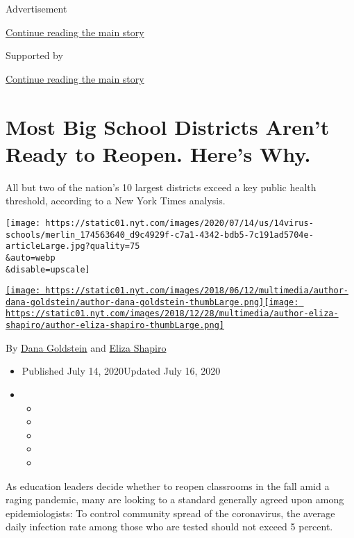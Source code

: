 Advertisement

\protect\hyperlink{after-top}{Continue reading the main story}

Supported by

\protect\hyperlink{after-sponsor}{Continue reading the main story}

\hypertarget{most-big-school-districts-arent-ready-to-reopen-heres-why}{%
\section{Most Big School Districts Aren't Ready to Reopen. Here's
Why.}\label{most-big-school-districts-arent-ready-to-reopen-heres-why}}

All but two of the nation's 10 largest districts exceed a key public
health threshold, according to a New York Times analysis.

\texttt{[image: https://static01.nyt.com/images/2020/07/14/us/14virus-schools/merlin\_174563640\_d9c4929f-c7a1-4342-bdb5-7c191ad5704e-articleLarge.jpg?quality=75\\\&auto=webp\\\&disable=upscale]}

\href{https://www.nytimes.com/by/dana-goldstein}{\texttt{[image: https://static01.nyt.com/images/2018/06/12/multimedia/author-dana-goldstein/author-dana-goldstein-thumbLarge.png]}}\href{https://www.nytimes.com/by/eliza-shapiro}{\texttt{[image: https://static01.nyt.com/images/2018/12/28/multimedia/author-eliza-shapiro/author-eliza-shapiro-thumbLarge.png]}}

By \href{https://www.nytimes.com/by/dana-goldstein}{Dana Goldstein} and
\href{https://www.nytimes.com/by/eliza-shapiro}{Eliza Shapiro}

\begin{itemize}
\item
  Published July 14, 2020Updated July 16, 2020
\item
  \begin{itemize}
  \item
  \item
  \item
  \item
  \item
  \end{itemize}
\end{itemize}

As education leaders decide whether to reopen classrooms in the fall
amid a raging pandemic, many are looking to a standard generally agreed
upon among epidemiologists: To control community spread of the
coronavirus, the average daily infection rate among those who are tested
should not exceed 5 percent.

